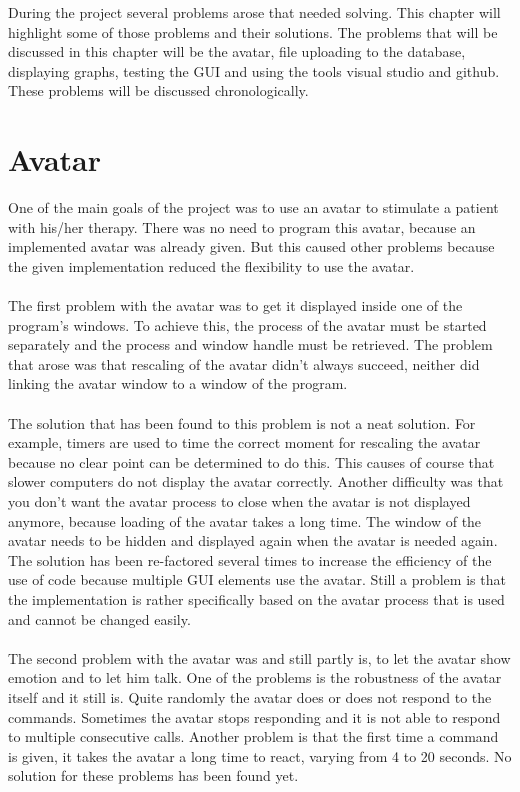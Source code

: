 
During the project several problems arose that needed solving. This chapter will highlight some of those problems and their solutions. The problems that will be discussed in this chapter will be the avatar, file uploading to the database, displaying graphs, testing the GUI and using the tools visual studio and github. These problems will be discussed chronologically.
\section{Avatar}
One of the main goals of the project was to use an avatar to stimulate a patient with his/her therapy. There was no need to program this avatar, because an implemented avatar was already given. But this caused other problems because the given implementation reduced the flexibility to use the avatar. 
\paragraph{}
The first problem with the avatar was to get it displayed inside one of the program's windows. To achieve this, the process of the avatar must be started separately and the process and window handle must be retrieved. The problem that arose was that rescaling of the avatar didn't always succeed, neither did linking the avatar window to a window of the program. 
\paragraph{}
The solution that has been found to this problem is not a neat solution. For example, timers are used to time the correct moment for rescaling the avatar because no clear point can be determined to do this. This causes of course that slower computers do not display the avatar correctly.
Another difficulty was that you don't want the avatar process to close when the avatar is not displayed anymore, because loading of the avatar takes a long time. The window of the avatar needs to be hidden and displayed again when the avatar is needed again.
The solution has been re-factored several times to increase the efficiency of the use of code because multiple GUI elements use the avatar. Still a problem is that the implementation is rather specifically based on the avatar process that is used and cannot be changed easily.
\paragraph{}
The second problem with the avatar was and still partly is, to let the avatar show emotion and to let him talk. One of the problems is the robustness of the avatar itself and it still is.  Quite randomly the avatar does or does not respond to the commands. Sometimes the avatar stops responding and it is not able to respond to multiple consecutive calls. Another problem is that the first time a command is given, it takes the avatar a long time to react, varying from 4 to 20 seconds. No solution for these problems has been found yet.
